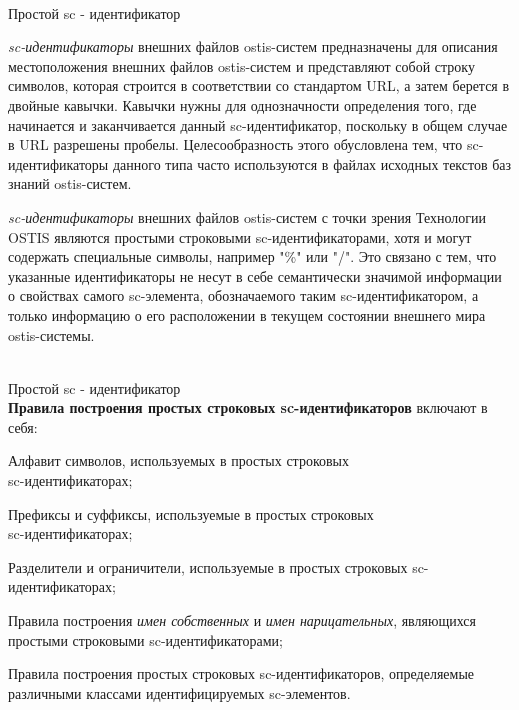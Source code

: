 \begin{frame}{\\Простой sc - идентификатор}
	\topline
	\justifying
	\vspace*{\fill}\\
	\small{
		\textit{sc-идентификаторы} внешних файлов ostis-систем предназначены для описания местоположения внешних файлов ostis-систем и представляют собой строку символов, которая строится в соответствии со стандартом URL, а затем берется в двойные кавычки. Кавычки нужны для однозначности определения того, где начинается и заканчивается данный sc-идентификатор, поскольку в общем случае в URL разрешены пробелы. Целесообразность этого обусловлена тем, что sc-идентификаторы данного типа часто используются в файлах исходных текстов баз знаний ostis-систем.
		
		\textit{sc-идентификаторы} внешних файлов ostis-систем с точки зрения Технологии OSTIS являются простыми строковыми sc-идентификаторами, хотя и могут содержать специальные символы, например "\%"{} или "/"{}. Это связано с тем, что указанные идентификаторы не несут в себе семантически значимой информации о свойствах самого sc-элемента, обозначаемого таким sc-идентификатором, а только информацию о его расположении в текущем состоянии внешнего мира ostis-системы.
	}
\end{frame}

\begin{frame}{\\Простой sc - идентификатор}
	\topline
	\justifying
	\vspace*{\fill}\\
	\textbf{Правила построения простых строковых sc-идентификаторов} включают в себя:
		\begin{textitemize}
			\item Алфавит символов, используемых в простых строковых\\ sc-идентификаторах;
			\item Префиксы и суффиксы, используемые в простых строковых\\ sc-идентификаторах;
			\item Разделители и ограничители, используемые в простых строковых sc-идентификаторах;
			\item Правила построения \textit{имен собственных} и \textit{имен нарицательных}, являющихся простыми строковыми sc-идентификаторами;
			\item Правила построения простых строковых sc-идентификаторов, определяемые различными классами идентифицируемых sc-элементов.
		\end{textitemize}
\end{frame}

